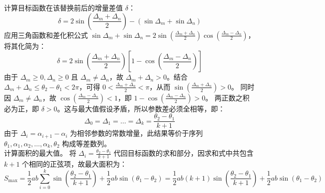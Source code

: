 \begin{solution}
计算目标函数在该替换前后的增量差值 $\delta$：
\[ \delta = 2\sin\left(\frac{\Delta_m + \Delta_n}{2}\right) - (\sin\Delta_m + \sin\Delta_n) \]
应用三角函数和差化积公式 $\sin\Delta_m + \sin\Delta_n = 2\sin\left(\frac{\Delta_m + \Delta_n}{2}\right)\cos\left(\frac{\Delta_m - \Delta_n}{2}\right)$，将其化简为：
\[ \delta = 2\sin\left(\frac{\Delta_m + \Delta_n}{2}\right) \left[ 1 - \cos\left(\frac{\Delta_m - \Delta_n}{2}\right) \right] \]
由于 $\Delta_m \ge 0, \Delta_n \ge 0$ 且 $\Delta_m \neq \Delta_n$，故 $\Delta_m + \Delta_n > 0$。结合 $\Delta_m + \Delta_n \le \theta_2 - \theta_1 < 2\pi$，可得 $0 < \frac{\Delta_m + \Delta_n}{2} < \pi$，从而 $\sin\left(\frac{\Delta_m + \Delta_n}{2}\right) > 0$。
同时因 $\Delta_m \neq \Delta_n$，故 $\cos\left(\frac{\Delta_m - \Delta_n}{2}\right) < 1$，即 $1 - \cos\left(\frac{\Delta_m - \Delta_n}{2}\right) > 0$。
两正数之积必为正，即 $\delta > 0$。这与最大值假设矛盾，所以参数差必须全相等，即：
\[ \Delta_0 = \Delta_1 = \dots = \Delta_k = \frac{\theta_2 - \theta_1}{k+1} \]
由于 $\Delta_i = \alpha_{i+1} - \alpha_i$ 为相邻参数的常数增量，此结果等价于序列 $\theta_1, \alpha_1, \alpha_2, \dots, \alpha_k, \theta_2$ 构成等差数列。\\
计算面积的最大值。
将 $\Delta_i = \frac{\theta_2 - \theta_1}{k+1}$ 代回目标函数的求和部分，因求和式中共包含 $k+1$ 个相同的正弦项，故最大面积为：
\[ S_{\max} = \frac{1}{2}ab \sum_{i=0}^k \sin\left(\frac{\theta_2 - \theta_1}{k+1}\right) + \frac{1}{2}ab \sin(\theta_1 - \theta_2) = \frac{1}{2} ab(k+1)\sin\left(\frac{\theta_2-\theta_1}{k+1}\right) + \frac{1}{2} ab\sin(\theta_1-\theta_2) \]

\end{solution}


